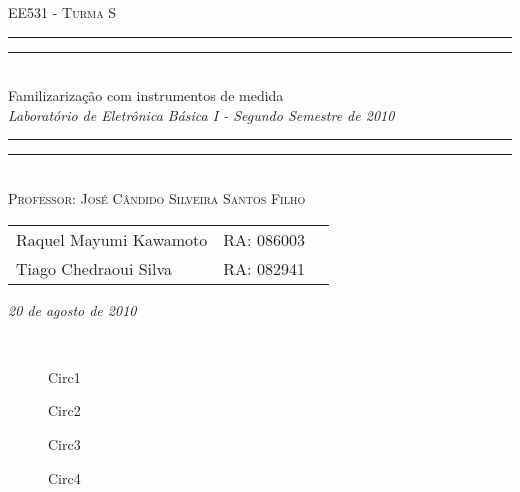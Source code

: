\documentclass[a4paper]{article} %
\date{Agosto 20, 2010}
\newcommand*{\titleTMB}{\begingroup \centering \settowidth{\unitlength}{\LARGE EE531} {\large\scshape EE531 - Turma S}\\[0.2\baselineskip] \rule{11.0cm}{1.6pt}\vspace*{-\baselineskip}\vspace*{2pt} \rule{11.0cm}{0.4pt}\\[\baselineskip] {\LARGE  Familizarização com instrumentos de medida}\\\vspace*{\baselineskip}  {\itshape Laboratório de Eletrônica Básica I - Segundo Semestre de 2010}\\ \rule{11.0cm}{0.4pt}\vspace*{-\baselineskip}\vspace{3.2pt} \rule{11.0cm}{1.6pt}\\[\baselineskip] {\large\scshape Professor: José Cândido Silveira Santos Filho}\par \vfill {\normalsize   \scshape 
    \begin{center} 
      \begin{tabular}{  l  l  p{5cm} } 
        Raquel Mayumi Kawamoto & RA: 086003\\
        Tiago Chedraoui Silva  & RA: 082941\\
      \end{tabular} \end{center}
    \itshape 20 de agosto de 2010    }\\[\baselineskip] \vspace{3.2pt} \endgroup}
\begin{document}
\titleTMB 
\newpage

\vspace{3mm}
\begin{figure}[h]
\centerline{}
\caption{Circ1 \label{tab:circ}}
\end{figure}

\vspace{3mm}
\begin{figure}[h]
\centerline{}
\caption{Circ2 \label{tab:circ}}
\end{figure}

\vspace{3mm}
\begin{figure}[h]
\centerline{}
\caption{Circ3 \label{tab:circ}}
\end{figure}

\vspace{3mm}
\begin{figure}[h]
\centerline{}
\caption{Circ4 \label{tab:circ}}
\end{figure}
\end{document}
